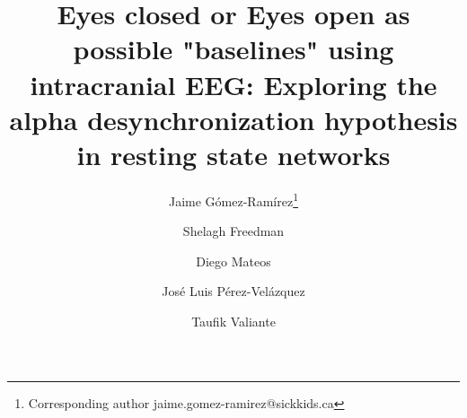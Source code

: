 \documentclass[11pt, onecolumn]{article}
\begin{document}
\def\mean#1{\left< #1 \right>}
\title{Eyes closed or Eyes open as possible "baselines" using intracranial EEG: Exploring the alpha desynchronization hypothesis in resting state networks}

\author[1]{Jaime G{\'o}mez-Ram{\'i}rez\thanks{Corresponding author \hspace{0.6cm} jaime.gomez-ramirez@sickkids.ca}}
\author[2]{Shelagh Freedman}%
\author[1]{Diego Mateos}
\author[1]{Jos{\'e} Luis P{\'e}rez-Vel{\'a}zquez}
\author[3]{Taufik Valiante}
\date{}

\maketitle
\end{document}
